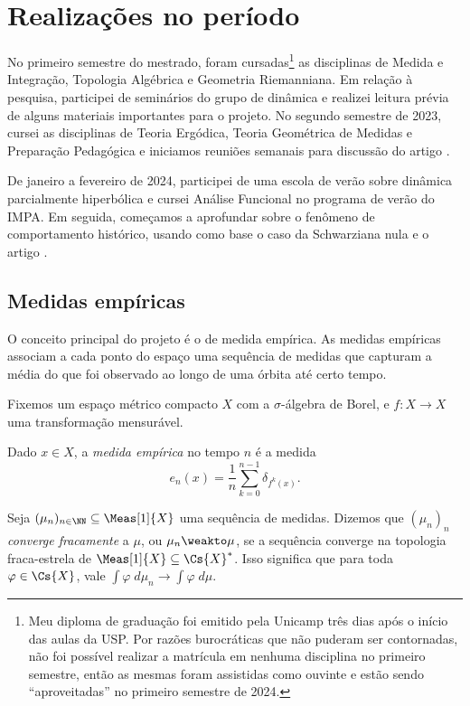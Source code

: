 \documentclass[../fapesp0]{subfiles}
\begin{document}
\chapter{Realizações no período}

No primeiro semestre do mestrado, foram cursadas\footnote{Meu diploma de graduação foi emitido pela Unicamp três dias após o início das aulas da USP. Por razões burocráticas que não puderam ser contornadas, não foi possível realizar a matrícula em nenhuma disciplina no primeiro semestre, então as mesmas foram assistidas como ouvinte e estão sendo ``aproveitadas'' no primeiro semestre de 2024.} as disciplinas de Medida e Integração, Topologia Algébrica e Geometria Riemanniana. Em relação à pesquisa, participei de seminários do grupo de dinâmica e realizei leitura prévia de alguns materiais importantes para o projeto.
No segundo semestre de 2023, cursei as disciplinas de Teoria Ergódica, Teoria Geométrica de Medidas e Preparação Pedagógica e iniciamos reuniões semanais para discussão do artigo .

De janeiro a fevereiro de 2024, participei de uma escola de verão sobre dinâmica parcialmente hiperbólica e cursei Análise Funcional no programa de verão do IMPA. Em seguida, começamos a aprofundar sobre o fenômeno de comportamento histórico, usando como base o caso da Schwarziana nula e o artigo \cite{crovisierEmpiricalMeasuresPartially2020}.

\section{Medidas empíricas}

O conceito principal do projeto é o de medida empírica. As medidas empíricas associam a cada ponto do espaço uma sequência de medidas que capturam a média do que foi observado ao longo de uma órbita até certo tempo.

Fixemos um espaço métrico compacto \(X\) com a \(\sigma\)-álgebra de Borel, e \(f \colon X \to X\) uma transformação mensurável. 
\begin{definition}
  Dado \(x \in X\), a \emph{medida empírica} no tempo \(n\) é a medida
  \begin{equation*}
    e_n(x) = \frac{1}{n} \sum_{k = 0}^{n - 1}\delta_{f^k(x)}.
  \end{equation*}
\end{definition}

\begin{definition}
  Seja \((\mu_n)_{n \in \NN} \subseteq \Meas[1]{X}\) uma sequência de medidas. Dizemos que \((\mu_n)_n\) \emph{converge fracamente} a \(\mu\), ou \(\mu_n \weakto \mu\), se a sequência converge na topologia fraca-estrela de \(\Meas[1]{X} \subseteq \Cs{X}^*\). Isso significa que para toda \(\varphi \in \Cs{X}\), vale \(\int \varphi \;d\mu_n \to \int \varphi \;d\mu\).
\end{definition}
\end{document}
